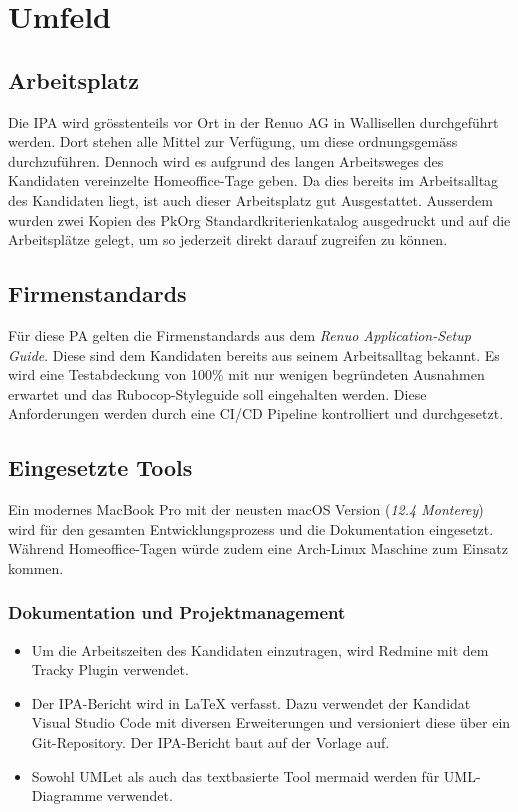 \chapter{Umfeld} \label{ch:environment}

\section{Arbeitsplatz}

Die IPA wird grösstenteils vor Ort in der Renuo AG in Wallisellen durchgeführt werden.
Dort stehen alle Mittel zur Verfügung, um diese ordnungsgemäss durchzuführen.
Dennoch wird es aufgrund des langen Arbeitsweges des Kandidaten vereinzelte Homeoffice-Tage geben. Da dies
bereits im Arbeitsalltag des Kandidaten liegt, ist auch dieser Arbeitsplatz gut Ausgestattet.
Ausserdem wurden zwei Kopien des PkOrg Standardkriterienkatalog ausgedruckt und auf die Arbeitsplätze gelegt,
um so jederzeit direkt darauf zugreifen zu können.

\section{Firmenstandards}

Für diese PA gelten die Firmenstandards aus dem \emph{Renuo Application-Setup Guide}. Diese sind
dem Kandidaten bereits aus seinem Arbeitsalltag bekannt. Es wird eine Testabdeckung von 100\% mit nur wenigen begründeten Ausnahmen erwartet
und das Rubocop-Styleguide soll eingehalten werden. Diese Anforderungen werden durch eine CI/CD Pipeline kontrolliert und durchgesetzt.

\section{Eingesetzte Tools} \label{sec:tools}

Ein modernes MacBook Pro mit der neusten macOS Version (\emph{12.4 Monterey}) wird für den gesamten Entwicklungsprozess und die Dokumentation eingesetzt.
Während Homeoffice-Tagen würde zudem eine Arch-Linux Maschine zum Einsatz kommen.

\subsection{Dokumentation und Projektmanagement}

\begin{itemize}
    \item Um die Arbeitszeiten des Kandidaten einzutragen, wird Redmine mit dem Tracky Plugin verwendet.
    \item Der IPA-Bericht wird in LaTeX verfasst. Dazu verwendet der Kandidat Visual Studio Code mit diversen Erweiterungen
          und versioniert diese über ein Git-Repository. Der IPA-Bericht baut auf der Vorlage \cite{Buhler_ipa-template_2022} auf.
    \item Sowohl UMLet als auch das textbasierte Tool mermaid werden für UML-Diagramme verwendet.
\end{itemize}

